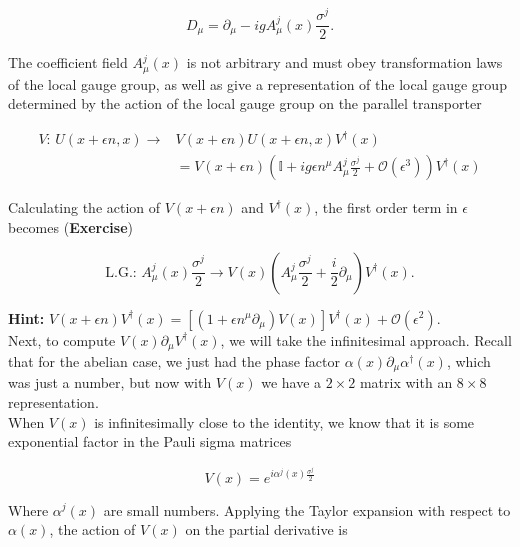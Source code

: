 \documentclass[10pt]{article}
\begin{document}
\begin{equation}
D_\mu = \partial_\mu - i g A_\mu^j (x) \frac{\sigma^j}{2}.
\end{equation}

\noindent The coefficient field $A_\mu^j (x)$ is not arbitrary and must obey transformation laws of the local gauge group, as well as give a representation of the local gauge group determined by the action of the local gauge group on the parallel transporter

\begin{align}
V: \, U(x + \epsilon n, x) \rightarrow& V(x + \epsilon n) U(x + \epsilon n, x) V^\dagger (x) \\
&= V(x + \epsilon n) \left( \mathbb{I} + i g \epsilon n^\mu A_\mu^j \frac{\sigma^j}{2} + \mathcal{O} (\epsilon^3) \right) V^\dagger (x)
\end{align}

\noindent Calculating the action of  $V(x + \epsilon n)$ and $V^\dagger (x)$, the first order term in $\epsilon$ becomes (\textbf{Exercise})

\begin{equation}
\text{L.G.}: \, A_\mu^j (x) \frac{\sigma^j}{2} \rightarrow V(x) \left( A_\mu^j \frac{\sigma^j}{2} + \frac{i}{2} \partial_\mu \right) V^\dagger (x) .
\end{equation}

\textbf{Hint:} $V(x+\epsilon n) V^\dagger (x) = \left[ (1+\epsilon n^\mu \partial_\mu)V(x) \right] V^\dagger (x) + \mathcal{O}(\epsilon^2)$. \\

\noindent Next, to compute $V(x) \partial_\mu V^\dagger (x)$, we will take the infinitesimal approach. Recall that for the abelian case, we just had the phase factor $\alpha(x) \partial_\mu \alpha^\dagger (x)$, which was just a number, but now with $V(x)$ we have a $2 \times 2$ matrix with an $8 \times 8$ representation. \\

\noindent When $V(x)$ is infinitesimally close to the identity, we know that it is some exponential factor in the Pauli sigma matrices

\begin{equation}
V(x) = e^{i \alpha^j (x) \frac{\sigma^j}{2}}
\end{equation}

\noindent Where $\alpha^j (x)$ are small numbers. Applying the Taylor expansion with respect to $\alpha(x)$, the action of $V(x)$ on the partial derivative is
\end{document}
